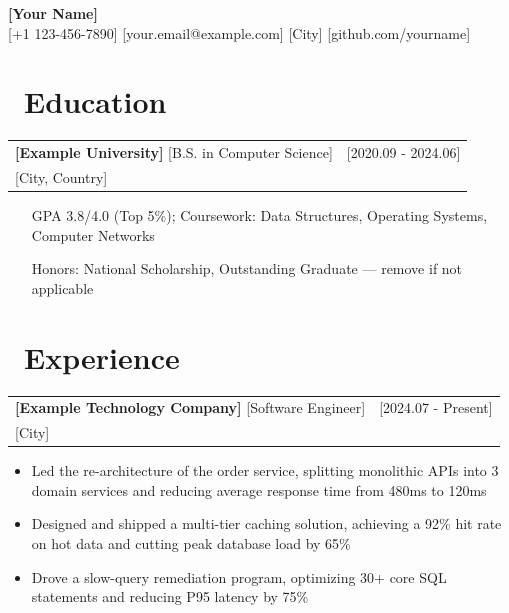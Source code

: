 \documentclass[10.5pt]{article}
\makeatletter
\newcommand{\entry}[4]{%
  \begin{tabularx}{\textwidth}{@{}X r@{}}
    \textbf{#1} \; {\small\color{graytext}#3} & {\small\color{graytext}#4} \\
    {\small\color{graytext}#2} & \\
  \end{tabularx}\vspace{-6pt}}
\makeatother
\begin{document}
\begin{center}
  {\LARGE\bfseries [Your Name]}\\[4pt]
  {\small
    {\color{primary}\faPhone*} [+1 123-456-7890] \;\;
    {\color{primary}\faEnvelope} [your.email@example.com] \;\;
    {\color{primary}\faMapMarker*} [City] \;\;
    {\color{primary}\faGithub} [github.com/yourname]}
\end{center}
\vspace{-4pt}

\section{\faGraduationCap\ Education}
\entry{[Example University]}{[City, Country]}{[B.S. in Computer Science]}{[2020.09 - 2024.06]}
\begin{itemize}
  \item [GPA 3.8/4.0 (Top 5\%); Coursework: Data Structures, Operating Systems, Computer Networks]
  \item [Honors: National Scholarship, Outstanding Graduate — remove if not applicable]
\end{itemize}

\section{\faBriefcase\ Experience}
\entry{[Example Technology Company]}{[City]}{[Software Engineer]}{[2024.07 - Present]}
\begin{itemize}
  \item Led the re-architecture of the order service, splitting monolithic APIs into 3 domain services and reducing average response time from 480ms to 120ms
  \item Designed and shipped a multi-tier caching solution, achieving a 92\% hit rate on hot data and cutting peak database load by 65\%
  \item Drove a slow-query remediation program, optimizing 30+ core SQL statements and reducing P95 latency by 75\%
\end{itemize}

\end{document}
